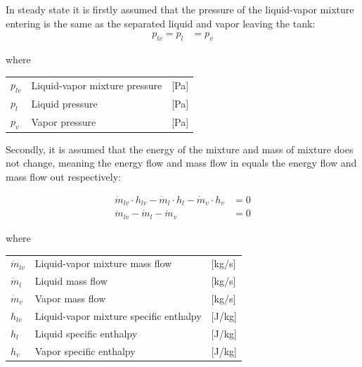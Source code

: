 In steady state it is firstly assumed that the pressure of the liquid-vapor mixture entering is the same as the separated liquid and vapor leaving the tank:
\begin{align}
	p_{lv} 	= p_{l}					&  = p_{v}
	\label{eq:Flash_tank_pressure}
\end{align}

where

\begin{center}
	\begin{tabular}{l p{8cm} l}
		$p_{lv}$				&  Liquid-vapor mixture pressure		& [\si{Pa}]\\
		$p_{l}$					&  Liquid pressure 						& [\si{Pa}] \\
		$p_{v}$					&  Vapor pressure						& [\si{Pa}]\\

	\end{tabular}
\end{center}


Secondly, it is assumed that the energy of the mixture and mass of mixture does not change, meaning the energy flow and mass flow in equals the energy flow and mass flow out respectively:

\begin{align}
	\dot{m}_{lv} \cdot  h_{lv}  - \dot{m}_{l} \cdot  h_{l} - \dot{m}_{v} \cdot  h_{v} & = 0 \label{eq:Flash_tank_energyflow} \\
	\dot{m}_{lv} - \dot{m}_{l} - \dot{m}_{v} & = 0  \label{eq:Flash_tank_massflow}
\end{align}

where

\begin{center}
	\begin{tabular}{l p{8cm} l}
		$\dot{m}_{lv}$			&  Liquid-vapor mixture mass flow			& [\si{kg}/\si{s}]\\
		$\dot{m}_{l}$			&  Liquid mass flow 						& [\si{kg}/\si{s}] \\
		$\dot{m}_{v}$			&  Vapor mass flow							& [\si{kg}/\si{s}]\\
		$h_{lv}$				&  Liquid-vapor mixture specific enthalpy	& [\si{J}/\si{kg}]\\
		$h_{l}$					&  Liquid specific enthalpy 				& [\si{J}/\si{kg}] \\
		$h_{v}$					&  Vapor specific enthalpy					& [\si{J}/\si{kg}]\\

	\end{tabular}
\end{center}


